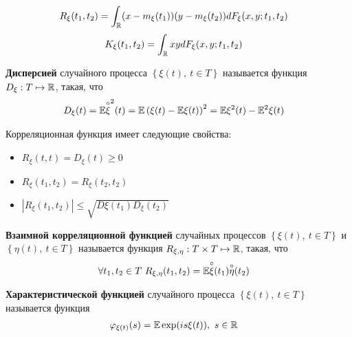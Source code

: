 \begin{align*}
  & R_\xi(t_1, t_2) = \int_{\mathbb{R}} (x-m_\xi(t_1))(y-m_\xi(t_2))dF_\xi(x,y;t_1,t_2)
\end{align*}
\begin{align*}
  & K_\xi(t_1, t_2) = \int_{\mathbb{R}} xy dF_\xi(x,y;t_1,t_2)
\end{align*}
\begin{Def}
    \textbf{Дисперсией} случайного процесса $\left\{\xi(t), \ t \in T\right\}$ называется функция $D_\xi: T \mapsto \mathbb{R}$, такая, что
    \begin{align*}
      & D_\xi(t) = \mathbb{E} \overset{\circ}{\xi}^2(t) = \mathbb{E} \left(\xi(t) - \mathbb{E} \xi(t)\right)^2 = \mathbb{E} \xi^2(t) - \mathbb{E}^2 \xi(t)
    \end{align*}
\end{Def}
Корреляционная функция имеет следующие свойства:
\begin{itemize}
    \item $R_\xi(t,t) = D_\xi(t) \geq 0$
    \item $R_\xi(t_1,t_2) = R_\xi(t_2,t_2)$
    \item $\left|R_\xi(t_1,t_2)\right|\leq \sqrt{D\xi(t_1)D_\xi(t_2)}$
\end{itemize}
\begin{Def}
    \textbf{Взаимной корреляционной функцией} случайных процессов $\left\{\xi(t), \ t \in T\right\}$ и $\left\{\eta(t), \ t \in T\right\}$ называется функция $R_{\xi, \eta}: T\times T \mapsto \mathbb{R}$, такая, что
    \begin{align*}
      & \forall t_1, t_2 \in T \ R_{\xi, \eta}(t_1, t_2) = \mathbb{E} \overset{\circ}{\xi}(t_1)\overset{\circ}{\eta}(t_2)
    \end{align*}
\end{Def}
\begin{Def}
    \textbf{Характеристической функцией} случайного процесса $\left\{\xi(t), \ t \in T\right\}$ называется функция
    \begin{align*}
      & \varphi_{\xi(t)}(s) = \mathbb{E} \exp (i s \xi(t)), \ s \in \mathbb{R}
    \end{align*}
\end{Def}
